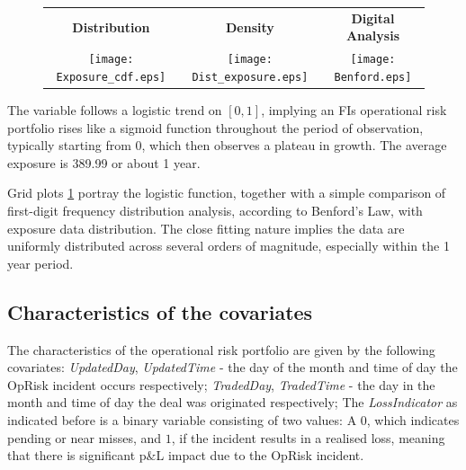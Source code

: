 \documentclass{DissertateUSU}
\begin{document}
\begin{figure}
\begin{frame}
      \centering
       \begin{tabular}{ccc}
        \textbf{Distribution} & \textbf{Density} & \textbf{Digital Analysis} \\
        \texttt{[image: Exposure\_cdf.eps]}
         &
         \texttt{[image: Dist\_exposure.eps]}
         &
         \texttt{[image: Benford.eps]}
         \end{tabular}
    \end{frame}
    \label{Exploration_analysis_exposure}
\end{figure}

The variable follows a logistic trend on \([0,1]\), implying an FIs
operational risk portfolio rises like a sigmoid function throughout the
period of observation, typically starting from \(0\), which then
observes a plateau in growth. The average exposure is 389.99 or about 1
year.\medskip

Grid plots \ref{Exploration_analysis_exposure} portray the logistic
function, together with a simple comparison of first-digit frequency
distribution analysis, according to Benford's Law, with exposure data
distribution. The close fitting nature implies the data are uniformly
distributed across several orders of magnitude, especially within the 1
year period.\medskip

\subsection{Characteristics of the covariates}

The characteristics of the operational risk portfolio are given by the
following covariates: \emph{UpdatedDay}, \emph{UpdatedTime} - the day of
the month and time of day the OpRisk incident occurs respectively;
\emph{TradedDay}, \emph{TradedTime} - the day in the month and time of
day the deal was originated respectively; The \emph{LossIndicator} as
indicated before is a binary variable consisting of two values: A \(0\),
which indicates pending or near misses, and \(1\), if the incident
results in a realised loss, meaning that there is significant p\&L
impact due to the OpRisk incident.\medskip
\end{document}
